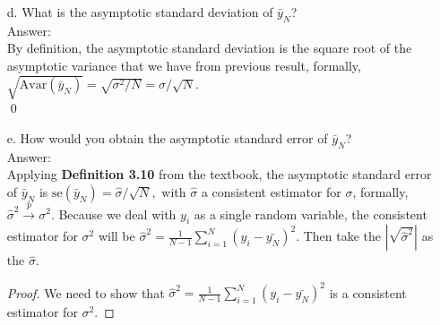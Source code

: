 \documentclass[10pt]{article}
\newcommand\convprob{\xrightarrow{p}}
\newcommand{\Av}{\text{Avar}}
\newcommand{\se}{\text{se}}
\begin{document}
\begin{enumerate}
\item[d.] What is the asymptotic standard deviation of $\bar{y}_N$?
\\ Answer:\\
By definition, the asymptotic standard deviation is the square root of the asymptotic variance that we have from previous result, formally, $\sqrt{\Av(\bar{y}_N)}=\sqrt{\sigma^2/N}=\sigma/\sqrt{N}.$\\ \qed
\item[e.] How would you obtain the asymptotic standard error of $\bar{y}_N$?
\\ Answer:\\
Applying \textbf{Definition 3.10} from the textbook, the asymptotic standard error of $\bar{y}_N$ is $\se(\bar{y}_N)=\hat{\sigma}/\sqrt{N},$ with $\hat{\sigma}$ a consistent estimator for $\sigma$, formally, $\hat{\sigma}^2\convprob\sigma^2$. Because we deal with $y_i$ as a single random variable, the consistent estimator for $\sigma^2$ will be $\hat{\sigma}^2=\frac{1}{N-1}\sum_{i=1}^N (y_i-\bar{y_N})^2.$ Then take the $|\sqrt{\hat{\sigma}^2}|$ as the $\hat{\sigma}$.
\begin{proof}
We need to show that $\hat{\sigma}^2=\frac{1}{N-1}\sum_{i=1}^N (y_i-\bar{y_N})^2$ is a consistent estimator for $\sigma^2$.
\end{proof}
\end{enumerate}
\end{document}
